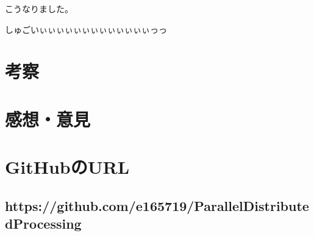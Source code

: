 \documentclass[14pt, oneside]{article}     	%
\begin{document}
こうなりました。

しゅごいぃぃぃぃぃぃぃぃぃぃぃぃぃっっ


\section{考察}






\section{感想・意見}
\section*{GitHubのURL}

\subsection*{https://github.com/e165719/ParallelDistributedProcessing}
\end{document}
